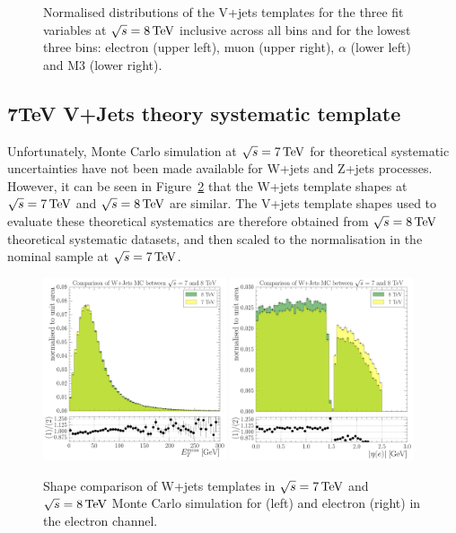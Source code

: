 \begin{figure}[hbtp]
	 \caption{Normalised distributions of the V+jets templates for the three fit variables at $\sqrt{s}=8\,\text{Te\hspace{-.08em}V}$
	 inclusive across all \met bins and for the lowest three \met bins: electron \abseta (upper
	 left), muon \abseta (upper right), $\alpha$ (lower left) and M3 (lower right).}
     \label{fig:MET_fit_variable_vjets_comparisons_8TeV}
\end{figure}
\FloatBarrier

\subsection{7TeV V+Jets theory systematic template}
\label{ss:7TeV_vjets_theory_systematic_template}
Unfortunately, Monte Carlo simulation at $\sqrt{s}=7\,\text{Te\hspace{-.08em}V}$ for theoretical systematic uncertainties have not
been made available for W+jets and Z+jets processes. However, it can be seen in
Figure~\ref{fig:wjets_7TeV_8TeV_comparison} that the W+jets template shapes at $\sqrt{s}=7\,\text{Te\hspace{-.08em}V}$ and
$\sqrt{s}=8\,\text{Te\hspace{-.08em}V}$ are similar. The V+jets template shapes used to evaluate these theoretical systematics are
therefore obtained from $\sqrt{s}=8\,\text{Te\hspace{-.08em}V}$ theoretical systematic datasets, and then scaled to the normalisation
in the nominal sample at $\sqrt{s}=7\,\text{Te\hspace{-.08em}V}$.

\begin{figure}[hbtp]
    \centering
     \includegraphics[width=0.48\textwidth]{Chapters/04_Analysis/04b_XSections/images/WJets_comparison/TTbar_plus_X_analysis_EPlusJets_Refselection_MET_patType1CorrectedPFMet_MET_0orMoreBtag.pdf}\hfill
	 \includegraphics[width=0.48\textwidth]{Chapters/04_Analysis/04b_XSections/images/WJets_comparison/TTbar_plus_X_analysis_EPlusJets_Refselection_Electron_electron_AbsEta_0orMoreBtag.pdf}\\
	 \caption{Shape comparison of W+jets templates in $\sqrt{s}=7\,\text{Te\hspace{-.08em}V}$ and $\sqrt{s}=8\,\text{Te\hspace{-.08em}V}$ Monte Carlo
	 simulation for \met (left) and electron \abseta (right) in the electron channel.}
     \label{fig:wjets_7TeV_8TeV_comparison}
\end{figure}

